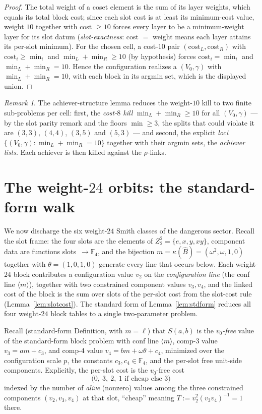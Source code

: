 \documentclass[11pt]{article}
\newcommand{\F}[1]{\mathbb{F}_{#1}}
\newcommand{\hB}{\hat{B}}
\newcommand{\slab}{\ell}                          %
\theoremstyle{plain}
\theoremstyle{definition}
\theoremstyle{remark}
\newtheorem*{remark}{Remark}
\begin{document}
\begin{proof}
The total weight of a coset element is the sum of its layer weights, which equals
its total block cost; since each slot cost is at least its minimum-cost value,
weight $10$ together with cost $\ge 10$ forces every layer to be a
minimum-weight layer for its slot datum (\emph{slot-exactness}: cost $=$ weight
means each layer attains its per-slot minimum). For the chosen cell, a cost-$10$
pair $(\mathrm{cost}_L,\mathrm{cost}_R)$ with $\mathrm{cost}_i\ge\min_i$ and
$\min_L+\min_R\ge 10$ (by hypothesis) forces $\mathrm{cost}_i=\min_i$ and
$\min_L+\min_R=10$. Hence the configuration realizes a $(V_0,\gamma)$ with
$\min_L+\min_R=10$, with each block in its argmin set, which is the displayed
union.
\end{proof}

\begin{remark}
The achiever-structure lemma reduces the weight-$10$ kill to two finite
sub-problems per cell: first, the \emph{cost-$8$ kill} $\min_L+\min_R\ge 10$ for
all $(V_0,\gamma)$ --- by the slot parity remark and the floors $\min\ge 3$, the
splits that could violate it are $(3,3)$, $(4,4)$, $(3,5)$ and $(5,3)$ --- and second, the explicit
\emph{loci} $\{(V_0,\gamma):\min_L+\min_R=10\}$ together with their argmin sets,
the \emph{achiever lists}. Each achiever is then killed against the
$\rho$-links.
\end{remark}
\section{The weight-\texorpdfstring{$24$}{24} orbits: the standard-form walk}\label{sec:wt24}

We now discharge the six weight-$24$ Smith classes of the dangerous sector. Recall the
slot frame: the four slots are the elements of $Z_2^2=\{e,x,y,xy\}$, component data are
functions slots~$\to\F4$, and the bijection $m=\kappa(\hB)=(\omega^2,\omega,1,0)$ together
with $\theta=(1,0,1,0)$ generate every line that occurs below. Each weight-$24$ block
contributes a configuration value $v_2$ on the \emph{configuration line} (the conf line
$\langle m\rangle$), together with two constrained component values $v_3,v_4$, and the
linked cost of the block is the sum over slots of the per-slot cost from the slot-cost
rule (Lemma~\ref{lem:slotcost}). The standard form of Lemma~\ref{lem:stdform} reduces all
four weight-$24$ block tables to a single two-parameter problem.

Recall (standard-form Definition, with $m=\slab$) that $S(a,b)$ is the \emph{$v_0$-free}
value of the standard-form block problem with conf line $\langle m\rangle$, comp-$3$ value
$v_3=am+c_3$, and comp-$4$ value $v_4=bm+\omega\theta+c_4$, minimized over the configuration
scale $p$, the constants $c_3,c_4\in\F4$, and the per-slot free unit-side components.
Explicitly, the per-slot cost is the $v_0$-free cost
\[
  \bigl(0,\ 3,\ 2,\ \text{$1$ if cheap else $3$}\bigr)
\]
indexed by the number of \emph{alive} (nonzero) values among the three constrained
components $(v_2,v_3,v_4)$ at that slot, ``cheap'' meaning
$T:=v_2^2(v_3v_4)^{-1}=1$ there.
\end{document}
